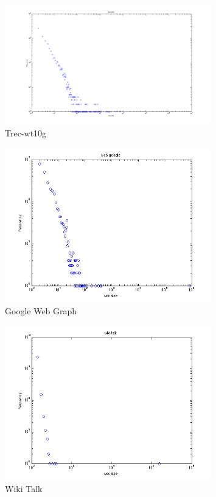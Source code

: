\begin{figure}[h]
\begin{center}
     \includegraphics[width=0.8\textwidth]{FIG/t3_trec_wt10.png} 
\caption{Trec-wt10g}
\label{t3:3}
\end{center}
\end{figure}


\begin{figure}[h]
\begin{center}
     \includegraphics[width=0.8\textwidth]{FIG/t3_web_google.png} 
\caption{Google Web Graph}
\label{t3:4}
\end{center}
\end{figure}


\begin{figure}[h]
\begin{center}
     \includegraphics[width=0.8\textwidth]{FIG/t3_wiki_talk.png} 
\caption{Wiki Talk}
\label{t3:5}
\end{center}
\end{figure}

